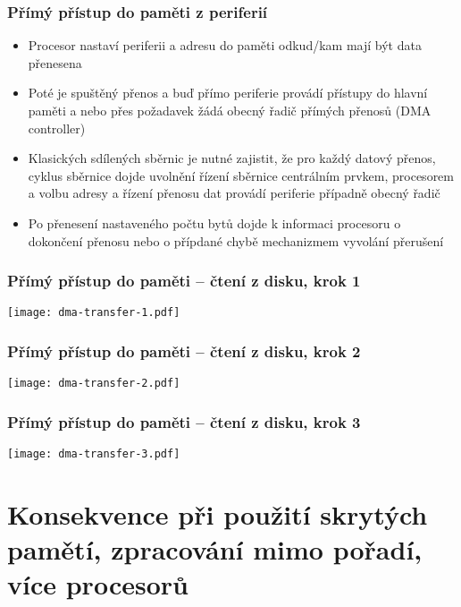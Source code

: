 \documentclass{beamer}
\begin{document}
\begin{frame}
\frametitle{Přímý přístup do paměti z periferií}

\begin{itemize}
 \item Procesor nastaví periferii a adresu do paměti odkud/kam mají být data přenesena
 \item Poté je spuštěný přenos a buď přímo periferie provádí přístupy do hlavní paměti
       a nebo přes požadavek žádá obecný řadič přímých přenosů (DMA controller)
 \item Klasických sdílených sběrnic je nutné zajistit, že pro každý datový přenos, cyklus
       sběrnice dojde uvolnění řízení sběrnice centrálním prvkem, procesorem a volbu adresy
       a řízení přenosu dat provádí periferie případně obecný řadič
 \item Po přenesení nastaveného počtu bytů dojde k informaci procesoru o dokončení přenosu
       nebo o přípdané chybě mechanizmem vyvolání přerušení
\end{itemize}

\end{frame}

\begin{frame}
\frametitle{Přímý přístup do paměti -- čtení z disku, krok 1}

\begin{center}
  \texttt{[image: dma-transfer-1.pdf]}
\end{center}

\end{frame}


\begin{frame}
\frametitle{Přímý přístup do paměti -- čtení z disku, krok 2}

\begin{center}
  \texttt{[image: dma-transfer-2.pdf]}
\end{center}

\end{frame}

\begin{frame}
\frametitle{Přímý přístup do paměti -- čtení z disku, krok 3}

\begin{center}
  \texttt{[image: dma-transfer-3.pdf]}
\end{center}

\end{frame}

\section{Konsekvence při použití skrytých pamětí, zpracování mimo pořadí, více procesorů}
\end{document}
